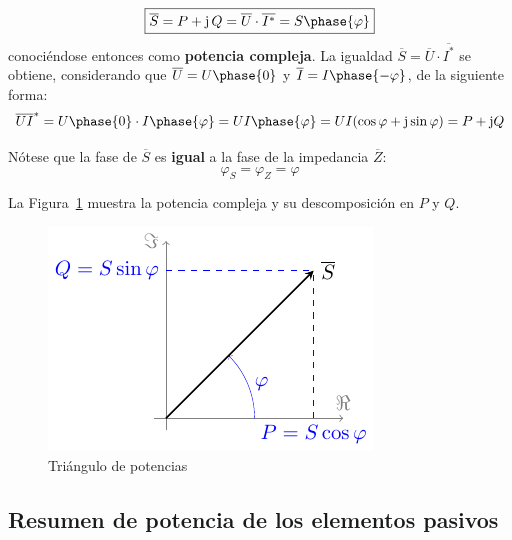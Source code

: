 \begin{itemize}
\begin{equation}
            \boxed{\overline{S}=P+\mathrm{j}\,Q=\overline{U}\cdot \overline{I^*}=S\phase{\varphi}}
          \end{equation}
          conociéndose entonces como \textbf{potencia compleja}. La
          igualdad $\overline{S}=\overline{U}\cdot \overline{I^*}$ se
          obtiene, considerando que $\overline{U} = U\phase{0}$ y
          $\overline{I} = I\phase{-\varphi}$, de la siguiente forma:
          \begin{equation*}
            \overline{U} \overline{I}^* = U\phase{0} \cdot I\phase{\varphi} = UI\phase{\varphi}= U I (\cos\varphi + \mathrm{j} \sin\varphi) = P + \mathrm{j} Q
          \end{equation*}
          \begin{remark}
            Nótese que la fase de $\overline{S}$ es \textbf{igual} a
            la fase de la impedancia $\overline{Z}$:
            \begin{equation*}
              \varphi_S = \varphi_Z = \varphi
            \end{equation*}
          \end{remark}
          La Figura~\ref{fig.trianguloPotencias} muestra la potencia
          compleja y su descomposición en $P$ y $Q$.
          \begin{figure}[H]
            \centering
            \includegraphics{../figs/trianguloPotencias.pdf}
            \caption{Triángulo de potencias}
            \label{fig.trianguloPotencias}
          \end{figure}
	\end{itemize}
	
	
        \subsection{Resumen de potencia de los elementos pasivos}
	
